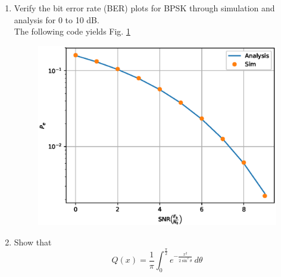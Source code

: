 \documentclass[10pt, a4paper]{article}
\begin{document}
\begin{enumerate}
\item
Verify the bit error rate (BER) plots for BPSK through simulation and analysis for 0 to 10 dB. \\
\solution
The following code yields Fig. \ref{fig:bpsk_ber}
\begin{center}
\end{center}
\begin{figure}[!h]
\centering
\includegraphics[width=\columnwidth]{images/bpsk2.eps}
\caption{}
\label{fig:bpsk_ber}
\end{figure}
\item
Show that
\begin{equation}
Q(x) = \frac{1}{\pi}\int^{\frac{\pi}{2}}_{0}e^{-\frac{x^2}{2\sin^2 \theta}}\,d\theta
\end{equation}
\solution 

\end{enumerate}
\end{document}
